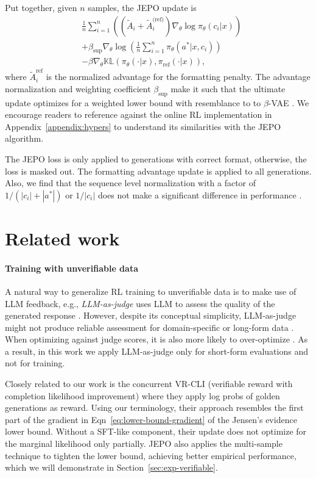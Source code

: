 \documentclass{article}
\theoremstyle{definition}
\begin{document}
Put together, given $n$ samples, the JEPO update is
\begin{align*}
    &\frac{1}{n} \sum_{i=1}^n \left(\left(\tilde{A}_i + \tilde{A}_i^{\text{(ref)}}\right) \nabla_\theta \log \pi_\theta(c_i|x)   \right) \\ &+ \beta_\text{sup} \nabla_\theta  \log \left(\frac{1}{n}\sum_{i=1}^n  \pi_\theta(a^\ast|x,c_i)\right) \\ &- \beta \nabla_\theta \mathbb{KL}\left(\pi_\theta(\cdot|x), \pi_\text{ref}(\cdot|x)\right),
\end{align*}
where $\tilde{A}_i^{\text{ref}}$ is the normalized advantage for the formatting penalty.
The advantage normalization and weighting coefficient $\beta_\text{sup}$ make it such that the ultimate update optimizes for a weighted lower bound with resemblance to to $\beta$-VAE \citep{higgins2017beta}. We encourage readers to reference against the online RL implementation in Appendix~\ref{appendix:hypers} to understand its similarities with the JEPO algorithm.

The JEPO loss is only applied to generations with correct format, otherwise, the loss is masked out. The formatting advantage update is applied to all generations. Also, we find that the sequence level normalization with a factor of $1/\left(|c_i|+|a^*|\right)$ or $1/|c_i|$ does not make a significant difference in performance \citep{shao2024deepseekmath,liu2025understanding}.

\section{Related work}

\paragraph{Training with unverifiable data} A natural way to generalize RL training to unverifiable data is to make use of LLM feedback, e.g., \emph{LLM-as-judge} uses LLM to assess the quality of the generated response \citep{lee2023rlaif,guo2024direct,yuan2025selfrewardinglanguagemodels}. However, despite its conceptual simplicity, LLM-as-judge might not produce reliable assessment for domain-specific or long-form data \citep{lightman2023let,petrov2025proof}. When optimizing against judge scores, it is also more likely to over-optimize \citep{gao2023scaling}. As a result, in this work we apply LLM-as-judge only for short-form evaluations and not for training.

Closely related to our work is the concurrent VR-CLI (verifiable reward with completion likelihood improvement) \citep{gurung2025learning} where they apply log probs of golden generations as reward. Using our terminology, their approach resembles the first part of the gradient in Eqn~\eqref{eq:lower-bound-gradient} of the Jensen's evidence lower bound. Without a SFT-like component, their update does not optimize for the marginal likelihood only partially. JEPO also applies the multi-sample technique to tighten the lower bound, achieving better empirical performance, which we will demonstrate in Section~\ref{sec:exp-verifiable}.
\end{document}
